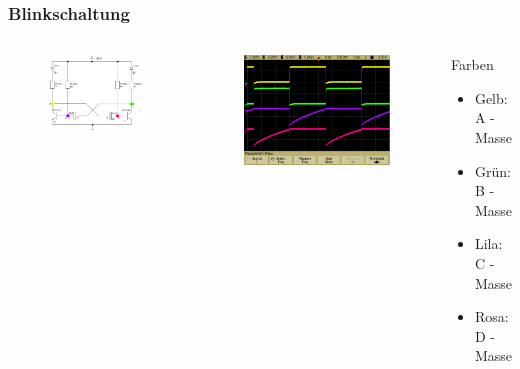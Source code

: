 \begin{frame}
    \frametitle{Blinkschaltung}
    \begin{columns}[c]
        \begin{figure}[H]
        \begin{center}
                \includegraphics[scale=0.3]{./img/schaltungen/blink_1.png}
        \end{center}
        \end{figure}
    \begin{figure}[H]
    \begin{center}
            \includegraphics[scale=0.12]{./img/oszi/Aufgabe232_220kOhm_1.png}
    \end{center}
    \end{figure}
    \begin{block}{Farben}
         \begin{itemize}
             \item Gelb: A - Masse
             \item Grün: B - Masse
             \item Lila: C - Masse
             \item Rosa: D - Masse
         \end{itemize}
    \end{block}
    

\end{columns}
\end{frame}
